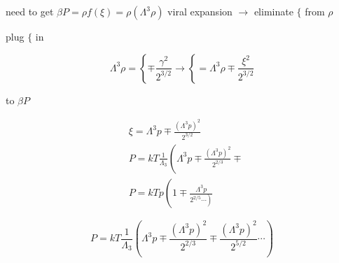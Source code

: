 \documentclass[10pt]{article}
\begin{document}
need to get $\beta P=\rho f(\xi)=\rho\left(\Lambda^{3} \rho\right)$ viral expansion $\rightarrow$ eliminate $\{$ from $\rho$

plug $\{$ in

$$
\Lambda^{3} \rho=\left\{\mp \frac { \gamma ^ { 2 } } { 2 ^ { 3 / 2 } } \rightarrow \left\{=\Lambda^{3} \rho \mp \frac{\xi^{2}}{2^{3 / 2}}\right.\right.
$$

to $\beta P$

$$
\begin{aligned}
& \xi=\Lambda^{3} p \mp \frac{\left(\Lambda^{3} p\right)^{2}}{2^{3 / 2}} \\
& P=k T \frac{1}{\Lambda_{3}}\left(\Lambda^{3} p \mp \frac{\left(\Lambda^{3} p\right)^{2}}{2^{2 / 3}} \mp\right. \\
& P=k T p\left(1 \mp \frac{\Lambda^{3} p}{\left.2^{2 / 5} \cdots\right)}\right.
\end{aligned}
$$

$$
P=k T \frac{1}{\Lambda_{3}}\left(\Lambda^{3} p \mp \frac{\left(\Lambda^{3} p\right)^{2}}{2^{2 / 3}} \mp \frac{\left(\Lambda^{3} p\right)^{2}}{2^{5 / 2}} \cdots\right)
$$
\end{document}
